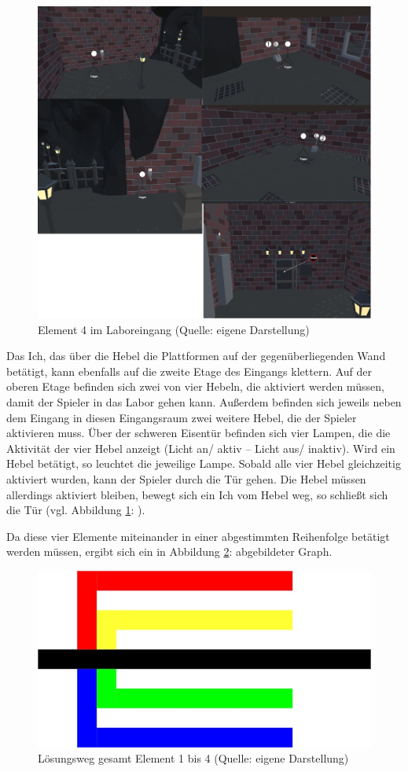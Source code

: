 \begin{figure}[ht]
\centering
\includegraphics[width=0.8\linewidth]{content/pictures/Raetsel-L02_R02_R04.jpg}
\caption{Element 4 im Laboreingang (Quelle: eigene Darstellung)}
\label{fig:L02_R02_R04}
\end{figure}

Das Ich, das über die Hebel die Plattformen auf der gegenüberliegenden Wand betätigt, kann ebenfalls auf die zweite Etage des Eingangs klettern. Auf der oberen Etage befinden sich zwei von vier Hebeln, die aktiviert werden müssen, damit der Spieler in das Labor gehen kann. Außerdem befinden sich jeweils neben dem Eingang in diesen Eingangsraum zwei weitere Hebel, die der Spieler aktivieren muss. Über der schweren Eisentür befinden sich vier Lampen, die die Aktivität der vier Hebel anzeigt (Licht an/ aktiv – Licht aus/ inaktiv). Wird ein Hebel betätigt, so leuchtet die jeweilige Lampe. Sobald alle vier Hebel gleichzeitig aktiviert wurden, kann der Spieler durch die Tür gehen. Die Hebel müssen allerdings aktiviert bleiben, bewegt sich ein  Ich vom Hebel weg, so schließt sich die Tür (vgl. Abbildung \ref{fig:L02_R02_R04}: ).

Da diese vier Elemente miteinander in einer abgestimmten Reihenfolge betätigt werden müssen, ergibt sich ein in Abbildung \ref{fig:L02_R02_E01_4_V01}:  abgebildeter Graph.

\begin{figure}[ht]
\centering
\includegraphics[width=0.8\linewidth]{content/pictures/Raetsel-L02_R02_E01_4_V01_Loesung}
\caption{Lösungsweg gesamt Element 1 bis 4 (Quelle: eigene Darstellung)}
\label{fig:L02_R02_E01_4_V01}
\end{figure}

